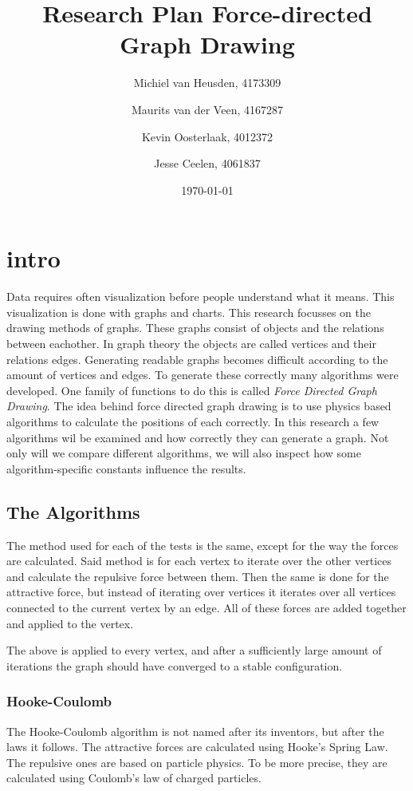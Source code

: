 \documentclass[a4paper,12pt]{article}
\title{Research Plan Force-directed Graph Drawing}
\author{
  Michiel van Heusden, 4173309 \and
  Maurits van der Veen, 4167287 \and
  Kevin Oosterlaak, 4012372 \and
  Jesse Ceelen, 4061837
  }
\date{\today}
\begin{document}
  \maketitle
  \tableofcontents
  \section{intro}
  Data requires often visualization before people understand what it means.
  This visualization is done with graphs and charts.
  This research focusses on the drawing methods of graphs.
  These graphs consist of objects and the relations between eachother.
  In graph theory the objects are called vertices and their relations edges.\cite{bondy1976graph}
  Generating readable graphs becomes difficult according to the amount of vertices and edges.
  To generate these correctly many algorithms were developed.
  One family of functions to do this is called \emph{Force Directed Graph Drawing}.
  The idea behind force directed graph drawing is to use physics based algorithms to calculate the positions of each correctly.
  In this research a few algorithms wil be examined and how correctly they can generate a graph.
  Not only will we compare different algorithms, we will also inspect how some algorithm-specific constants influence the results.

  \subsection{The Algorithms}\label{par:algorithms}
    The method used for each of the tests is the same,  except for the way the forces are calculated.
    Said method is for each vertex to iterate over the other vertices and calculate the repulsive force between them.
    Then the same is done for the attractive force, but instead of iterating over vertices it iterates over all vertices connected to the current vertex by an edge. All of these forces are added together and applied to the vertex.
    
    The above is applied to every vertex, and after a sufficiently large amount of iterations the graph should have converged to a stable configuration.

    \subsubsection{Hooke-Coulomb}
    The Hooke-Coulomb algorithm is not named after its inventors, but after the laws it follows.
    The attractive forces are calculated using Hooke's Spring Law.
    The repulsive ones are based on particle physics.
    To be more precise, they are calculated using Coulomb's law of charged particles.
\end{document}
